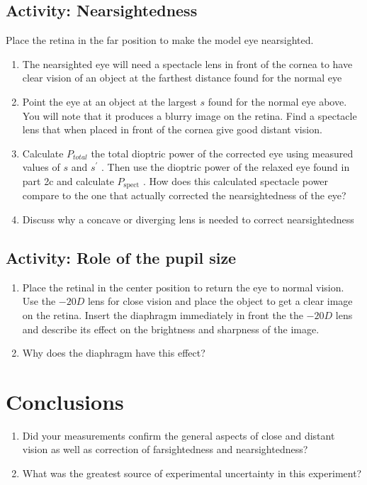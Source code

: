 \subsection{Activity: Nearsightedness}
Place the retina in the far position to make the model eye nearsighted. 
\begin{enumerate}
	\item The nearsighted eye will need a spectacle lens in front of the cornea to have clear vision of an object at the farthest distance found for the normal eye
	\item Point the eye at an object at the largest $s$ found for the normal eye above. You will note that it produces a blurry image on the retina. Find a spectacle lens that when placed in front of the cornea give good distant vision.
	\item Calculate $P_{total}$ the total dioptric power of the corrected eye using measured values of $s$ and $s^{\prime}$ . Then use the dioptric power of the relaxed eye found in part 2c and calculate $P_{\textrm{spect}}$ . How does this calculated spectacle power compare to the one that actually corrected the nearsightedness of the eye?
	\item Discuss why a concave or diverging lens is needed to correct nearsightedness
\end{enumerate}

\subsection{Activity: Role of the pupil size}
\begin{enumerate}
	 \item Place the retinal in the center position to return the eye to normal vision. Use the $-20 D$ lens for close vision and place the object to get a clear image on the retina. Insert the diaphragm immediately in front the the $-20 D$ lens and describe its effect on the brightness and sharpness of the image.
	 \item Why does the diaphragm have this effect?
\end{enumerate}

\section{Conclusions} 
\begin{enumerate}
\item Did your measurements confirm the general aspects of close and distant vision as well as correction of farsightedness and nearsightedness? 
\item What was the greatest source of experimental uncertainty in this experiment?
\end{enumerate}


\endinput
